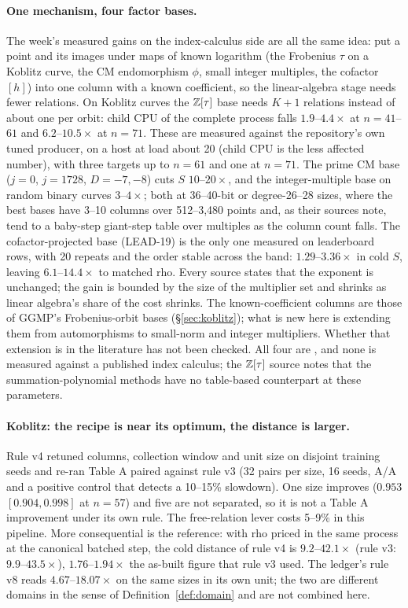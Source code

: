 \paragraph{One mechanism, four factor bases.} The week's measured gains on
the index-calculus side are all the same idea: put a point and its images
under maps of known logarithm (the Frobenius $\tau$ on a Koblitz curve, the
CM endomorphism $\phi$, small integer multiples, the cofactor $[h]$) into
one column with a known coefficient, so the linear-algebra stage needs fewer
relations. On Koblitz curves the $\mathbb{Z}[\tau]$ base needs $K+1$ relations
instead of about one per orbit: child CPU of the complete process falls
$1.9$--$4.4\times$ at $n=41$--$61$ and $6.2$--$10.5\times$ at $n=71$. These
are measured against the repository's own tuned producer, on a host at load
about 20 (child CPU is the less affected number), with three targets up to
$n=61$ and one at $n=71$. The prime CM base ($j=0$, $j=1728$, $D=-7,-8$) cuts
$S$ $10$--$20\times$, and the integer-multiple base on random binary curves
$3$--$4\times$; both at 36--40-bit or degree-26--28 sizes, where the best
bases have 3--10 columns over 512--3{,}480 points and, as their sources note,
tend to a baby-step giant-step table over multiples as the column count
falls. The
cofactor-projected base (LEAD-19) is the only one measured on leaderboard
rows, with 20 repeats and the order stable across the band: $1.29$--$3.36\times$
in cold $S$, leaving $6.1$--$14.4\times$ to matched rho. Every source states
that the exponent is unchanged; the gain is bounded by the size of the
multiplier set and shrinks as linear algebra's share of the cost shrinks.
The known-coefficient columns are those of GGMP's Frobenius-orbit bases
\cite{ggmp2020} (\S\ref{sec:koblitz}); what is new here is extending them
from automorphisms to small-norm and integer multipliers. Whether that
extension is in the literature has not been checked. All four are
, and none is measured against a published index
calculus; the $\mathbb{Z}[\tau]$ source notes that the summation-polynomial methods
have no table-based counterpart at these parameters.

\paragraph{Koblitz: the recipe is near its optimum, the distance is
larger.} Rule v4 retuned columns, collection window and unit size on
disjoint training seeds and re-ran Table A paired against rule v3 (32 pairs
per size, 16 seeds, A/A and a positive control that detects a 10--15\%
slowdown). One size improves ($0.953$ $[0.904,0.998]$ at $n=57$) and five are
not separated, so it is not a Table A improvement under its own rule. The
free-relation lever costs 5--9\% in this pipeline. More consequential is the
reference: with rho priced in the same process at the canonical batched step,
the cold distance of rule v4 is $9.2$--$42.1\times$ (rule v3: $9.9$--$43.5\times$), $1.76$--$1.94\times$ the as-built
figure that rule v3 used. The ledger's rule v8 reads $4.67$--$18.07\times$ on
the same sizes in its own unit; the two are different domains in the sense of
Definition~\ref{def:domain} and are not combined here.

